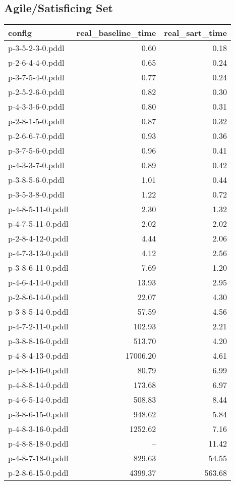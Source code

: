 \documentclass{article}
\begin{document}
                    \subsection*{Agile/Satisficing Set}
                    
                            \begin{center}
                            \scriptsize
                            \begin{tabular}{@{}l|r|r@{}}
                            config & real\_baseline\_time & real\_sart\_time\\\midrule
                             p-3-5-2-3-0.pddl&0.60&0.18\\
 p-2-6-4-4-0.pddl&0.65&0.24\\
 p-3-7-5-4-0.pddl&0.77&0.24\\
 p-2-5-2-6-0.pddl&0.82&0.30\\
 p-4-3-3-6-0.pddl&0.80&0.31\\
 p-2-8-1-5-0.pddl&0.87&0.32\\
 p-2-6-6-7-0.pddl&0.93&0.36\\
 p-3-7-5-6-0.pddl&0.96&0.41\\
 p-4-3-3-7-0.pddl&0.89&0.42\\
 p-3-8-5-6-0.pddl&1.01&0.44\\
 p-3-5-3-8-0.pddl&1.22&0.72\\
 p-4-8-5-11-0.pddl&2.30&1.32\\
 p-4-7-5-11-0.pddl&2.02&2.02\\
 p-2-8-4-12-0.pddl&4.44&2.06\\
 p-4-7-3-13-0.pddl&4.12&2.56\\
 p-3-8-6-11-0.pddl&7.69&1.20\\
 p-4-6-4-14-0.pddl&13.93&2.95\\
 p-2-8-6-14-0.pddl&22.07&4.30\\
 p-3-8-5-14-0.pddl&57.59&4.56\\
 p-4-7-2-11-0.pddl&102.93&2.21\\
 p-3-8-8-16-0.pddl&513.70&4.20\\
 p-4-8-4-13-0.pddl&17006.20&4.61\\
 p-4-8-4-16-0.pddl&80.79&6.99\\
 p-4-8-8-14-0.pddl&173.68&6.97\\
 p-4-6-5-14-0.pddl&508.83&8.44\\
 p-3-8-6-15-0.pddl&948.62&5.84\\
 p-4-8-3-16-0.pddl&1252.62&7.16\\
 p-4-8-8-18-0.pddl&--&11.42\\
 p-4-8-7-18-0.pddl&829.63&54.55\\
 p-2-8-6-15-0.pddl&4399.37&563.68
                            \end{tabular}
                            \end{center}
                    
\end{document}

